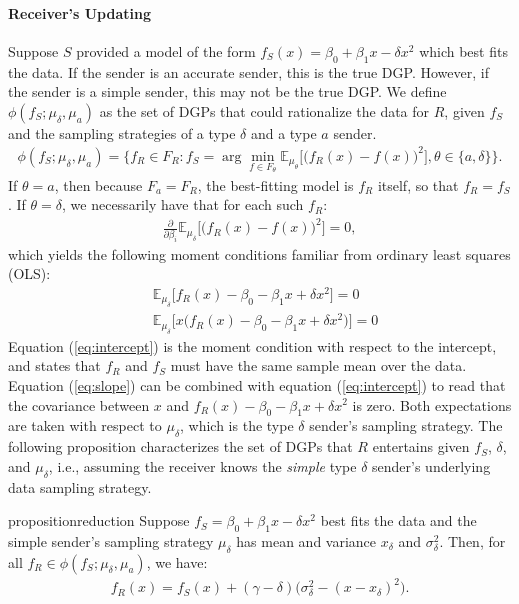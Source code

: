 \documentclass[11pt,dvipsnames]{article}
\begin{document}
\paragraph{Receiver's Updating}
Suppose $S$ provided a model of the form $f_S(x) = \beta_0+\beta_1 x-\delta x^2$ which best fits the data.
If the sender is an accurate sender, this is the true DGP.
However, if the sender is a simple sender, this may not be the true DGP.
We define $\phi(f_S;\mu_\delta,\mu_a)$ as the set of DGPs that could rationalize the data for $R$, given $f_S$ and the sampling strategies of a type $\delta$ and a type $a$ sender.
\begin{align*}
\phi(f_S;\mu_\delta,\mu_a) = \bigg\{f_R \in F_R : f_S =\arg\min_{f \in F_\theta} \mathbb{E}_{\mu_\theta}\big[\big(f_R(x)-f(x)\big)^2\big], \theta \in \{a,\delta\} \bigg\}.	
\end{align*}
If $\theta = a$, then because $F_a = F_R$, the best-fitting model is $f_R$ itself, so that $f_R = f_S$.
If $\theta = \delta$, we necessarily have that for each such $f_R$:
\begin{align*}
\frac{\partial}{\partial \beta_i} \mathbb{E}_{\mu_\delta}\big[\big(f_R(x)-f(x)\big)^2\big] = 0, 
\end{align*}
which yields the following moment conditions familiar from ordinary least squares (OLS):
\begin{align}
&\mathbb{E}_{\mu_\delta}\big[f_R(x)-\beta_0-\beta_1 x + \delta x^2\big] =0
\label{eq:intercept}
\\
&\mathbb{E}_{\mu_\delta}\big[x\big(f_R(x)-\beta_0-\beta_1 x+\delta x^2 \big)\big] =0
\label{eq:slope}
\end{align}
Equation (\ref{eq:intercept}) is the moment condition with respect to the intercept, and states that $f_R$ and $f_S$ must have the same sample mean over the data.
Equation (\ref{eq:slope}) can be combined with equation (\ref{eq:intercept}) to read that the covariance between $x$ and $f_R(x)-\beta_0-\beta_1 x + \delta x^2$ is zero.
Both expectations are taken with respect to $\mu_\delta$, which is the type $\delta$ sender's sampling strategy.
The following proposition characterizes the set of DGPs that $R$ entertains given $f_S$, $\delta$, and $\mu_\delta$, i.e., assuming the receiver knows the \emph{simple} type $\delta$ sender's underlying data sampling strategy.
\begin{restatable}{proposition}{reduction}
\label{prop:reduction}
Suppose $f_S = \beta_0+\beta_1x-\delta x^2$ best fits the data and the simple sender's sampling strategy $\mu_\delta$ has mean and variance $x_\delta$ and $\sigma_\delta^2$. Then, for all $f_R \in \phi(f_S;\mu_\delta,\mu_a)$, we have:
\begin{align*}
f_R(x) = f_S(x)+(\gamma-\delta)\big(\sigma_\delta^2-(x-x_\delta)^2\big).
\end{align*}
\end{restatable}
\end{document}
